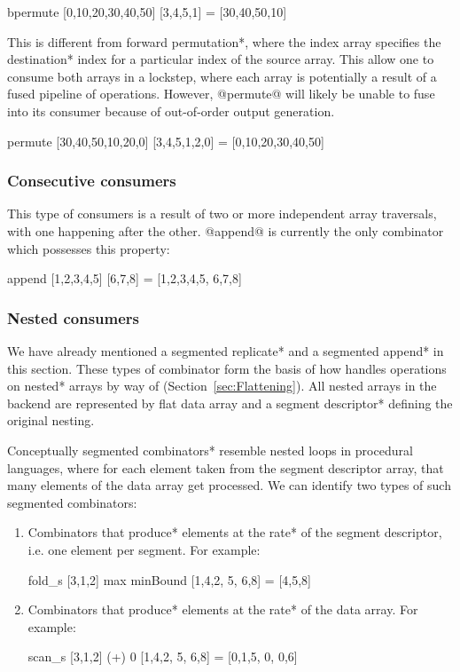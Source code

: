 \documentclass[preamble.tex]{subfiles}
\begin{document}
\begin{hscode}
bpermute [0,10,20,30,40,50] [3,4,5,1] = [30,40,50,10]
\end{hscode}

This is different from \*forward permutation*, where the index array specifies the \*destination* index for a particular index of the source array. This allow one to consume both arrays in a lockstep, where each array is potentially a result of a fused pipeline of operations. However, @permute@ will likely be unable to fuse into its consumer because of out-of-order output generation.

\begin{hscode}
permute [30,40,50,10,20,0] [3,4,5,1,2,0] = [0,10,20,30,40,50]
\end{hscode}


\subsubsection{Consecutive consumers}

This type of consumers is a result of two or more independent array traversals, with one happening after the other. @append@ is currently the only combinator which possesses this property:

\begin{hscode}
append [1,2,3,4,5] [6,7,8] = [1,2,3,4,5, 6,7,8]
\end{hscode}


\subsubsection{Nested consumers}

We have already mentioned a \*segmented replicate* and a \*segmented append* in this section. These types of combinator form the basis of how \DPH handles operations on \*nested* arrays by way of  (Section~\ref{sec:Flattening}). All nested arrays in the \DPH backend are represented by flat data array and a \*segment descriptor* defining the original nesting.

Conceptually \*segmented combinators* resemble nested loops in procedural languages, where for each element taken from the segment descriptor array, that many elements of the data array get processed. We can identify two types of such segmented combinators:
\begin{enumerate}
\item Combinators that \*produce* elements at the \*rate* of the segment descriptor, i.e. one element per segment. For example:

\begin{hscode}
fold_s [3,1,2] max minBound [1,4,2, 5, 6,8] = [4,5,8]
\end{hscode}

\item Combinators that \*produce* elements at the \*rate* of the data array. For example:

\begin{hscode}
scan_s [3,1,2] (+) 0 [1,4,2, 5, 6,8] = [0,1,5, 0, 0,6]
\end{hscode}
\end{enumerate}
\end{document}
